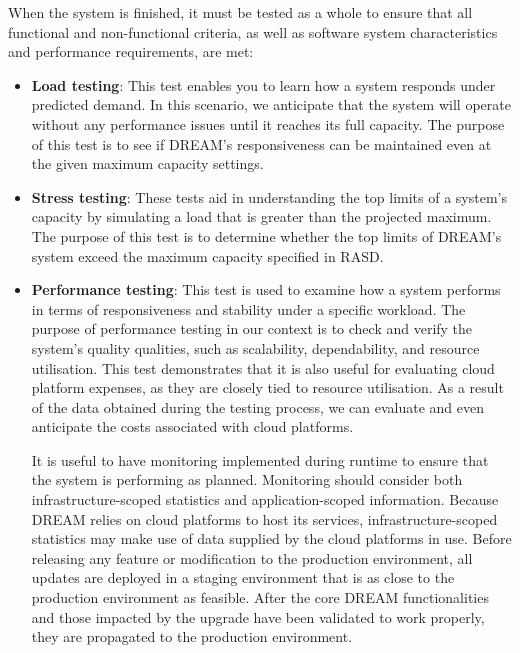 \documentclass[../../main.tex]{subfiles}
\begin{document}
When the system is finished, it must be tested as a whole to ensure that all functional and non-functional criteria, as well as software system characteristics and performance requirements, are met:


\begin{itemize}

	\item \textbf{Load testing}: This test enables you to learn how a system responds under predicted demand. In this scenario, we anticipate that the system will operate without any performance issues until it reaches its full capacity. The purpose of this test is to see if DREAM's responsiveness can be maintained even at the given maximum capacity settings.

	\item \textbf{Stress testing}: These tests aid in understanding the top limits of a system's capacity by simulating a load that is greater than the projected maximum. The purpose of this test is to determine whether the top limits of DREAM's system exceed the maximum capacity specified in RASD.

	\item \textbf{Performance testing}: This test is used to examine how a system performs in terms of responsiveness and stability under a specific workload. The purpose of performance testing in our context is to check and verify the system's quality qualities, such as scalability, dependability, and resource utilisation. This test demonstrates that it is also useful for evaluating cloud platform expenses, as they are closely tied to resource utilisation. As a result of the data obtained during the testing process, we can evaluate and even anticipate the costs associated with cloud platforms.
	
	It is useful to have monitoring implemented during runtime to ensure that the system is performing as planned. Monitoring should consider both infrastructure-scoped statistics and application-scoped information. Because DREAM relies on cloud platforms to host its services, infrastructure-scoped statistics may make use of data supplied by the cloud platforms in use.
    Before releasing any feature or modification to the production environment, all updates are deployed in a staging environment that is as close to the production environment as feasible. After the core DREAM functionalities and those impacted by the upgrade have been validated to work properly, they are propagated to the production environment. 


\end{itemize} 
\end{document}
